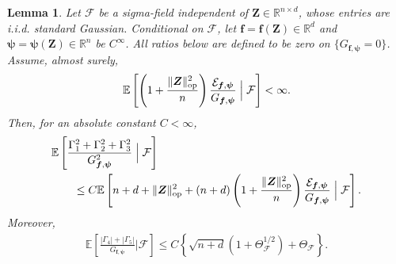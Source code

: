 \documentclass{article}
\theoremstyle{plain}
\newtheorem{lemma}[theorem]{Lemma}
\theoremstyle{definition}
\theoremstyle{definition}
\DeclarePairedDelimiter\norm{\lVert}{\rVert}
\def\R{{\mathbb{R}}}
\def\E{{\mathbb{E}}}
\def\mathbold{\boldsymbol}
\def\bff{\mathbold{f}}\def\fhat{\widehat{f}}\def\hf{\widehat{f}}\def\ftil{\widetilde{f}}
\def\bZ{\mathbold{Z}}\def\hbZ{{\widehat{\bZ}}}\def\tbZ{{\widetilde{\bZ}}}
\begin{document}
\begin{lemma}
\label{lem:normalized-Gaussian-Stein}
Let $\mathcal F$ be a sigma-field independent of
$\bZ\in\R^{n\times d}$, whose entries are i.i.d. standard Gaussian.  Conditional
on $\mathcal F$, let $\bff=\bff(\bZ)\in\R^d$ and
$\boldsymbol\psi=\boldsymbol\psi(\bZ)\in\R^n$ be $C^\infty$.
All ratios below are defined to be zero on
$\{G_{\bff,\boldsymbol\psi}=0\}$. Assume, almost surely,
\begin{align*}
    \E\left[
       \left(1+\frac{\norm{\bZ}_{\rm op}^2}{n}\right)
       \frac{\calE_{\bff,\boldsymbol\psi}}
            {G_{\bff,\boldsymbol\psi}}
       \mathrel{\Big|}\mathcal F
    \right]<\infty.
\end{align*}
Then, for an absolute constant $C<\infty$,
\begin{align}
    &\E\left[
       \frac{\Gamma_1^2+\Gamma_2^2+\Gamma_3^2}
            {G_{\bff,\boldsymbol\psi}^2}
       \mathrel{\Big|}\mathcal F
    \right]\notag\\
    &\qquad\leq
    C\E\left[
       n+d+\norm{\bZ}_{\rm op}^2
       +(n+d)\left(1+\frac{\norm{\bZ}_{\rm op}^2}{n}\right)
       \frac{\calE_{\bff,\boldsymbol\psi}}
            {G_{\bff,\boldsymbol\psi}}
       \mathrel{\Big|}\mathcal F
    \right].
    \label{eq:conditional-normalized-first-order}
\end{align}
Moreover,
\begin{align}
    \E\left[
       \frac{|\Gamma_4|+|\Gamma_5|}
            {G_{\bff,\boldsymbol\psi}}
       \mathrel{\Big|}\mathcal F
    \right]
    \leq C\left\{
       \sqrt{n+d}\left(1+\Theta_{\mathcal F}^{1/2}\right)
       +\Theta_{\mathcal F}
    \right\}.
    \label{eq:conditional-normalized-second-order}
\end{align}
\end{lemma}
\end{document}
